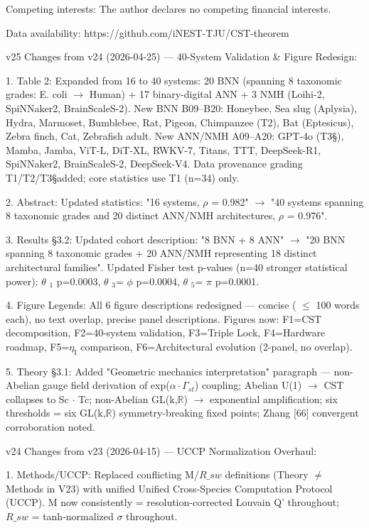 \documentclass[a4paper,12pt]{article}
\providecommand{\textsubscript}[1]{\ensuremath{_{\text{#1}}}}
\begin{document}
Competing interests: The author declares no competing financial interests.

Data availability: https://github.com/iNEST-TJU/CST-theorem

v25 Changes from v24 (2026-04-25) --- 40-System Validation \& Figure Redesign:

1.
Table 2: Expanded from 16 to 40 systems: 20 BNN (spanning 8 taxonomic grades: E. coli  $\rightarrow$  Human) + 17 binary-digital ANN + 3 NMH (Loihi-2, SpiNNaker2, BrainScaleS-2).
New BNN B09--B20: Honeybee, Sea slug (Aplysia), Hydra, Marmoset, Bumblebee, Rat, Pigeon, Chimpanzee (T2\dag), Bat (Eptesicus), Zebra finch, Cat, Zebrafish adult.
New ANN/NMH A09--A20: GPT-4o (T3\S), Mamba, Jamba, ViT-L, DiT-XL, RWKV-7, Titans, TTT, DeepSeek-R1, SpiNNaker2, BrainScaleS-2, DeepSeek-V4.
Data provenance grading T1/T2\dag/T3\S added; core statistics use T1 (n=34) only.

2. Abstract: Updated statistics: "16 systems,  $\rho$  = 0.982"  $\rightarrow$  "40 systems spanning 8 taxonomic grades and 20 distinct ANN/NMH architectures,  $\rho$  = 0.976".

3. Results \S3.2: Updated cohort description: "8 BNN + 8 ANN"  $\rightarrow$  "20 BNN spanning 8 taxonomic grades + 20 ANN/NMH representing 18 distinct architectural families". Updated Fisher test p-values (n=40 stronger statistical power):  $\theta$ \textsubscript{1} p=0.0003,  $\theta$ \textsubscript{3}= $\phi$  p=0.0004,  $\theta$ \textsubscript{5}= $\pi$  p=0.0001.

4. Figure Legends: All 6 figure descriptions redesigned --- concise ( $\leq$ 100 words each), no text overlap, precise panel descriptions. Figures now: F1=CST decomposition, F2=40-system validation, F3=Triple Lock, F4=Hardware roadmap, F5=$\eta_{\text{I}}$ comparison, F6=Architectural evolution (2-panel, no overlap).

5. Theory \S3.1: Added "Geometric mechanics interpretation" paragraph --- non-Abelian gauge field derivation of exp($\alpha \cdot \Gamma_{st}$) coupling; Abelian U(1)  $\rightarrow$  CST collapses to Sc $\cdot$ Tc; non-Abelian GL(k,$\mathbb{R}$)  $\rightarrow$  exponential amplification; six thresholds = six GL(k,$\mathbb{R}$) symmetry-breaking fixed points; Zhang [66] convergent corroboration noted.

v24 Changes from v23 (2026-04-15) --- UCCP Normalization Overhaul:

1. Methods/UCCP: Replaced conflicting M/$R\_{sw}$ definitions (Theory  $\neq$  Methods in V23) with unified Unified Cross-Species Computation Protocol (UCCP). M now consistently = resolution-corrected Louvain Q' throughout; $R\_{sw}$ = tanh-normalized  $\sigma$  throughout.
\end{document}
